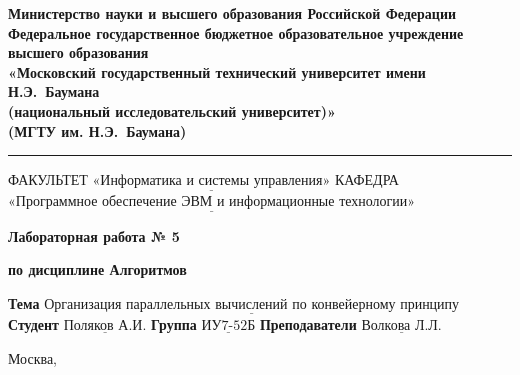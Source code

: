 \thispagestyle{empty}

\noindent\begin{minipage}{\textwidth}\centering
	\textbf{Министерство науки и высшего образования Российской Федерации}\\
	\textbf{Федеральное государственное бюджетное образовательное учреждение высшего образования}\\
	\textbf{«Московский государственный технический университет имени Н.Э.~Баумана}\\
	\textbf{(национальный исследовательский университет)»}\\
	\textbf{(МГТУ им. Н.Э.~Баумана)}
\end{minipage}

\noindent\rule{\linewidth}{3pt}
\newline\newline
\noindent ФАКУЛЬТЕТ $\underline{\text{«Информатика и системы управления»}}$ \newline\newline
\noindent КАФЕДРА $\underline{\text{«Программное обеспечение ЭВМ и информационные технологии»}}$

\vspace{1cm}

\begin{center}
	\noindent\centering
		\Large\textbf{Лабораторная работа № 5}
\end{center}

\begin{center}
	\noindent\centering
		\Large\textbf{по дисциплине  Алгоритмов\guillemotright}
\end{center}

\noindent\textbf{Тема} $\underline{\text{Организация параллельных вычислений по конвейерному принципу}}$\newline\newline
\noindent\textbf{Студент} $\underline{\text{Поляков А.И.}}$\newline\newline
\noindent\textbf{Группа} $\underline{\text{ИУ7-52Б}}$\newline\newline
\noindent\textbf{Преподаватели} $\underline{\text{Волкова Л.Л.}}$\newline

\begin{center}
	\vfill
	Москва,~\the\year
\end{center}
\clearpage